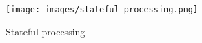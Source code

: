 \begin{figure}[t]
    \centering
    \texttt{[image: images/stateful\_processing.png]}
    \caption{Stateful processing}
    \label{fig:state}
\end{figure}